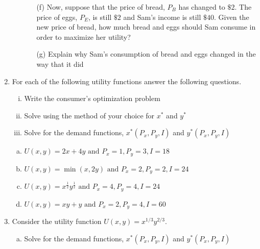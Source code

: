 \documentclass[11pt]{article}
\begin{document}
\begin{enumerate}
\begin{enumerate}
\begin{enumerate}[(a)]
    
    \vspace*{50mm}
    \item[(f)] Now, suppose that the price of bread, $P_B$ has changed to $\$2$. The price of eggs, $P_E$, is still $\$2$ and Sam's income is still $\$40$. Given the new price of bread, how much bread and eggs should Sam consume in order to maximize her utility?
    
    \vspace*{50mm}
    \item[(g)] Explain why Sam's consumption of bread and eggs changed in the way that it did
  \end{enumerate}
\end{enumerate}

\newpage
  \item For each of the following utility functions answer the following questions.
  	  \begin{enumerate}[(i)]
    \item Write the consumer's optimization problem
    \item Solve using the method of your choice for $x^{*}$ and $y^{*}$
    \item Solve for the demand functions, $x^*(P_x, P_y, I)$ and $y^*(P_x, P_y, I)$
  \end{enumerate}

  \begin{enumerate}[(a)]
    \item $U(x,y) = 2x + 4y \text{ and } P_x = 1, P_y = 3, I = 18$    
    
    \vspace*{90mm}
	\item $U(x,y) = \min(x, 2y) \text{ and } P_x = 2, P_y = 2, I = 24$
    
\newpage
    \item $U(x,y) = x^{\frac{1}{2}} y^{\frac{1}{2}}  \text{ and } P_x = 4, P_y = 4, I = 24$


	\vspace*{100mm}
	\item $U(x,y) = xy + y \text{ and } P_x = 2, P_y = 4, I = 60$    
  \end{enumerate}	  
\newpage
  \item Consider the utility function $U(x,y) = x^{1/3} y^{2/3}$. 
  
  \begin{enumerate}[(a)]
    \item Solve for the demand functions, $x^*(P_x, P_y, I)$ and $y^*(P_x, P_y, I)$
    

\end{enumerate}
\end{enumerate}
\end{document}
